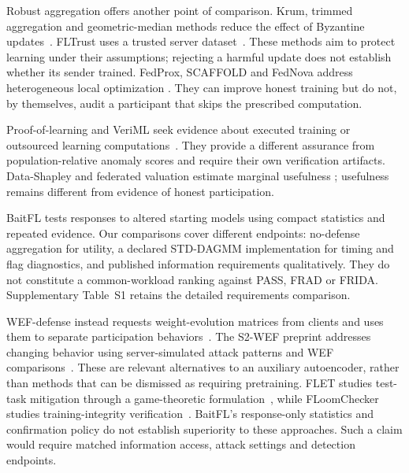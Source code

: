 \documentclass[journal]{IEEEtran}
\makeatletter
\renewcommand{\section}{\@startsection{section}{1}{\z@}{1.5ex}{0.7ex}{\normalfont\normalsize\centering\scshape}}
\makeatother
\begin{document}
Robust aggregation offers another point of comparison. Krum, trimmed
aggregation and geometric-median methods reduce the effect of Byzantine
updates~\cite{blanchard2017krum,yin2018byzantine,pillutla2022rfa}.
FLTrust uses a trusted server dataset~\cite{cao2021fltrust}. These methods
aim to protect learning under their assumptions; rejecting a harmful
update does not establish whether its sender trained. FedProx, SCAFFOLD
and FedNova address heterogeneous local optimization
\cite{li2020fedprox,karimireddy2020scaffold,wang2020fednova}. They can
improve honest training but do not, by themselves, audit a participant
that skips the prescribed computation.

Proof-of-learning and VeriML seek evidence about executed training or
outsourced learning computations~\cite{jia2021prooflearning,zhao2021veriml}.
They provide a different assurance from population-relative anomaly
scores and require their own verification artifacts. Data-Shapley and
federated valuation estimate marginal usefulness
\cite{ghorbani2019datashapley,jia2019datavaluation,liu2022gtgshapley};
usefulness remains different from evidence of honest participation.

BaitFL tests responses to altered starting models using compact
statistics and repeated evidence. Our comparisons cover different
endpoints: no-defense aggregation for utility, a declared STD-DAGMM
implementation for timing and flag diagnostics, and published information
requirements qualitatively. They do not constitute a common-workload
ranking against PASS, FRAD or FRIDA. Supplementary Table~S1 retains the
detailed requirements comparison.

WEF-defense instead requests weight-evolution matrices from clients and
uses them to separate participation behaviors~\cite{chen2022wef}.
The S2-WEF preprint addresses changing behavior using server-simulated
attack patterns and WEF comparisons~\cite{nakamura2026s2wef}. These are
relevant alternatives to an auxiliary autoencoder, rather than methods
that can be dismissed as requiring pretraining. FLET studies test-task
mitigation through a game-theoretic formulation~\cite{guo2026flet}, while
FLoomChecker studies training-integrity verification~\cite{liang2024floom}.
BaitFL's response-only statistics and confirmation policy do not establish
superiority to these approaches. Such a claim would require matched
information access, attack settings and detection endpoints.

\section{Threat Model}\label{sec:threat}
\end{document}
